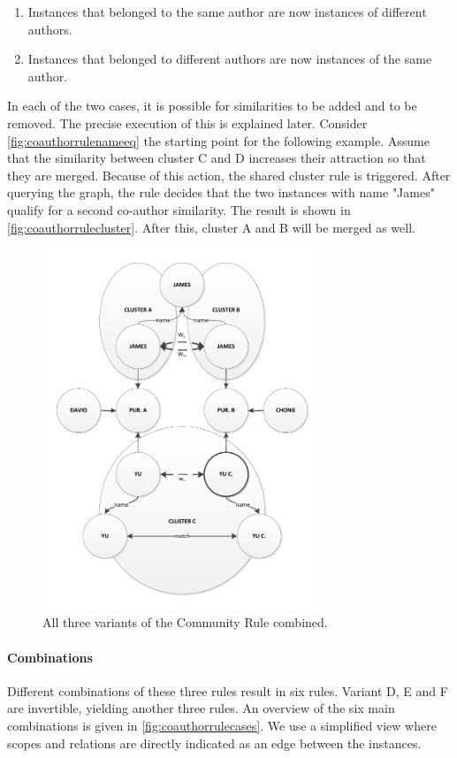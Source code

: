 \begin{enumerate}
\item Instances that belonged to the same author are now instances of different authors.
\item Instances that belonged to different authors are now instances of the same author.
\end{enumerate}

In each of the two cases, it is possible for similarities to be added and to be removed. The precise execution of this is explained later. Consider \autoref{fig:coauthorrulenameeq} the starting point for the following example. Assume that the similarity between cluster C and D increases their attraction so that they are merged. Because of this action, the shared cluster rule is triggered. After querying the graph, the rule decides that the two instances with name "James" qualify for a second co-author similarity. The result is shown in \autoref{fig:coauthorrulecluster}. After this, cluster A and B will be merged as well.

\begin{figure}[htb]
	\centering
		\includegraphics[width=0.75\textwidth]{fig/coauthorrulecluster}
	\caption{All three variants of the Community Rule combined.}
	\label{fig:coauthorrulecluster}
\end{figure}

\paragraph{Combinations} Different combinations of these three rules result in six rules. Variant D, E and F are invertible, yielding another three rules. An overview of the six main combinations is given in \autoref{fig:coauthorrulecases}. We use a simplified view where scopes and relations are directly indicated as an edge between the instances.

